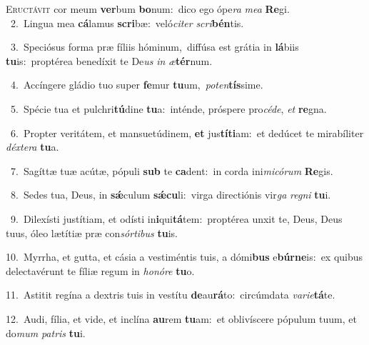 \lettrine{\initial\textcolor{\initialcolor}{E}}{ructávit} cor meum \textbf{ver}\-bum \textbf{bo}\-num:~\star dico ego ópe\textit{ra} \textit{me}\-\textit{a} \textbf{Re}\-gi.\\
{\numbfont\textcolor{\numbcolor}{~2.}}~Lingua mea \textbf{cá}\-lamus \textbf{scri}\-bæ:~\star veló\-\textit{ci}\-\textit{ter} \textit{scri}\-\textbf{bén}tis.\par
{\numbfont\textcolor{\numbcolor}{~3.}}~Speciósus forma præ fíliis hóminum,~\dagger diffúsa est grátia in \textbf{lá}\-biis \textbf{tu}\-is:~\star proptérea benedíxit te De\textit{us} \textit{in} \textit{æ}\-\textbf{tér}num.\par
{\numbfont\textcolor{\numbcolor}{~4.}}~Accíngere gládio tuo super \textbf{fe}\-mur \textbf{tu}\-um,~\star \textit{pot}\-\textit{en}\textbf{tís}sime.\par
{\numbfont\textcolor{\numbcolor}{~5.}}~Spécie tua et pulchri\-\textbf{tú}\-dine \textbf{tu}\-a:~\star inténde, próspere pro\-\textit{cé}\-\textit{de}, \textit{et} \textbf{re}\-gna.\par
{\numbfont\textcolor{\numbcolor}{~6.}}~Propter veritátem, et mansuetúdinem, \textbf{et} jus\-\textbf{tí}\-\textbf{ti}am:~\star et dedúcet te mirabíliter \textit{déx}\-\textit{te}\textit{ra} \textbf{tu}\-a.\par
{\numbfont\textcolor{\numbcolor}{~7.}}~Sagíttæ tuæ acútæ, pópuli \textbf{sub} te \textbf{ca}\-dent:~\star in corda ini\-\textit{mi}\-\textit{có}\textit{rum} \textbf{Re}\-gis.\par
{\numbfont\textcolor{\numbcolor}{~8.}}~Sedes tua, Deus, in \textbf{sǽ}\-culum \textbf{sǽ}\-\textbf{cu}li:~\star virga directiónis vir\textit{ga} \textit{re}\-\textit{gni} \textbf{tu}\-i.\par
{\numbfont\textcolor{\numbcolor}{~9.}}~Dilexísti justítiam, et odísti in\-\textbf{i}\-qui\-\textbf{tá}\-tem:~\star proptérea unxit te, Deus, Deus tuus, óleo lætítiæ præ con\-\textit{sór}\-\textit{ti}\textit{bus} \textbf{tu}\-is.\par
{\numbfont\textcolor{\numbcolor}{10.}}~Myrrha, et gutta, et cásia a vestiméntis tuis, a dómi\textbf{bus} e\-\textbf{búr}\-\textbf{ne}is:~\star ex quibus delectavérunt te fíliæ regum in \textit{ho}\-\textit{nó}\textit{re} \textbf{tu}\-o.\par
{\numbfont\textcolor{\numbcolor}{11.}}~Astitit regína a dextris tuis in vestítu \textbf{de}\-au\-\textbf{rá}\-to:~\star circúmdata \textit{va}\-\textit{ri}\textit{e}\textbf{tá}te.\par
{\numbfont\textcolor{\numbcolor}{12.}}~Audi, fília, et vide, et inclína \textbf{au}\-rem \textbf{tu}\-am:~\star et oblivíscere pópulum tuum, et do\textit{mum} \textit{pa}\-\textit{tris} \textbf{tu}\-i.\par
